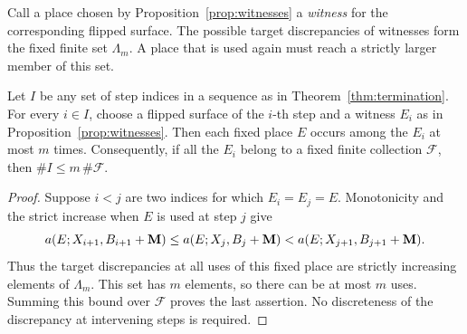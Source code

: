 Call a place chosen by Proposition~\ref{prop:witnesses} a \emph{witness}
for the corresponding flipped surface.  The possible target discrepancies
of witnesses form the fixed finite set $\Lambda_m$.  A place that is used
again must reach a strictly larger member of this set.

\begin{lemma}
\label{lem:finite-use}
Let $I$ be any set of step indices in a sequence as in Theorem~\ref{thm:termination}.  For every
$i\in I$, choose a flipped surface of the $i$-th step and a witness $E_i$
as in Proposition~\ref{prop:witnesses}.  Then each fixed place $E$
occurs among the $E_i$ at most $m$ times.  Consequently, if all the
$E_i$ belong to a fixed finite collection $\mathcal F$, then
$\#I\leq m\,\#\mathcal F$.
\end{lemma}

\begin{proof}
Suppose $i<j$ are two indices for which $E_i=E_j=E$.  Monotonicity and
the strict increase when $E$ is used at step $j$ give
\[
 a(E;X_{i+1},B_{i+1}+\mathbf M)
 \leq a(E;X_j,B_j+\mathbf M)
 <a(E;X_{j+1},B_{j+1}+\mathbf M).
\]
Thus the target discrepancies at all uses of this fixed place are
strictly increasing elements of $\Lambda_m$.  This set has $m$ elements,
so there can be at most $m$ uses.  Summing this bound over
$\mathcal F$ proves the last assertion.  No discreteness of the
discrepancy at intervening steps is required.
\end{proof}
